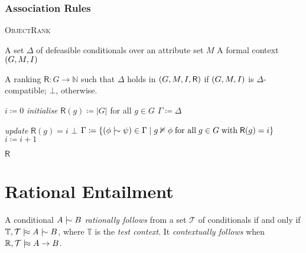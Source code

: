 \subsection{Association Rules}
\label{subsection:association-rules}




\begin{algo} {\textsc{ObjectRank}}

	\label{algorithm:ObjectRank}

	\Require A set $\Delta$ of defeasible conditionals over an attribute set
	$M$ \Require A formal context $(G,M,\mathrel{I})$

	\Ensure A ranking $\mathsf{R} \colon G \to \mathbb{N}$ such that $\Delta$
	holds in $(G,M,\mathrel{I},\mathsf{R})$ if $(G,M,\mathrel{I})$ is $\Delta$-compatible; $\bot$, otherwise.

	\State $i \coloneq 0$ \State \textit{initialise} $\mathsf{R}(g) \coloneq
		\vert G \vert$ for all $g \in G$ \State $\Gamma \coloneq \Delta$

	\textit{update} $\mathsf{R}(g) = i$
	\EndIf
	\State \Return $\bot$ \EndIf
	\State $\Gamma \coloneq \{(\phi \twiddle \psi) \in \Gamma \mid g \nvDash
		\phi \; \text{for all} \; g \in G \; \text{with}\; \mathsf{R}(g) = i\}$
	\State $i \coloneq i + 1$
	\EndFor
	\EndWhile

	\State \Return $\mathsf{R}$
\end{algo}

\chapter{Rational Entailment}
\begin{definition}
	A conditional $A \twiddle B$ \emph{rationally follows} from a set $\mathcal{T}$ of conditionals if and only if
	$\mathbb{T}, \mathcal{T}\dentails A \twiddle B$, where $\mathbb{T}$ is the \emph{test context}. It \emph{contextually
		follows} when $\mathbb{R}, \mathcal{T}\mid\hskip-0.40ex\approx A \rightarrow B$.
\end{definition}

